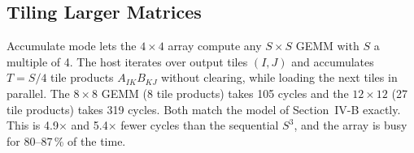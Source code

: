 \subsection{Tiling Larger Matrices}
Accumulate mode lets the $4\times4$ array compute any $S\times S$ GEMM
with $S$ a multiple of 4. The host iterates over output tiles $(I,J)$ and
accumulates $T=S/4$ tile products
$A_{IK}B_{KJ}$ without clearing, while loading the next tiles in parallel.
The $8\times8$ GEMM (8 tile products) takes 105 cycles and the
$12\times12$ (27 tile products) takes 319 cycles. Both match the model of
Section~IV-B exactly. This is 4.9$\times$ and 5.4$\times$ fewer cycles
than the sequential $S^3$, and the array is busy for 80--87\,\% of the
time.

